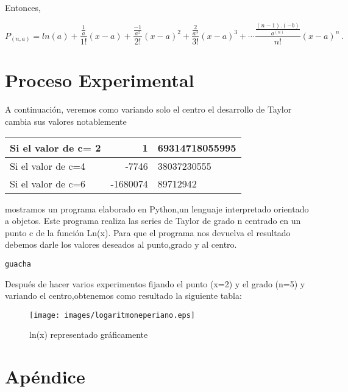 \documentclass[spanish,a4paper,11pt,twoside]{report}
\begin{document}
Entonces,

\[ P_{(n,a)} = ln(a)+\frac{\frac{1}{a}}{1!}(x-a)+\frac{\frac{-1}{a^2}}{2!}(x-a)^2+\frac{\frac{2}{a^3}}{3!}(x-a)^3+\cdots \frac{ \frac{(n-1).(-b)}{a^{(n)}}}{n!} (x-a)^{n}\,. \]

\chapter{Proceso Experimental} 
A continuación, veremos como variando solo el centro el desarrollo de Taylor cambia sus valores notablemente

\begin{tabular}{|l | r@{,}l |}
\hline
Si el valor de c= 2 &  1 & 69314718055995\\
\hline
Si el valor de c=4  & -7746 & 38037230555\\
\hline
Si el valor de c=6  & -1680074 & 89712942
\\
\hline
\end{tabular}


mostramos un programa elaborado en Python,un lenguaje interpretado orientado a objetos. Este programa realiza las series de Taylor de grado n centrado en un punto c de la función Ln(x). Para que el programa nos 
devuelva el resultado debemos darle los valores deseados al punto,grado y al centro. 

\begin{verbatim}
guacha

\end{verbatim} 

Después de hacer varios experimentos fijando el punto (x=2) y el grado (n=5) y variando el centro,obtenemos como resultado la siguiente tabla:




\begin{figure}[!th]
\begin{center}
\texttt{[image: images/logaritmoneperiano.eps]}
\caption{ln(x) representado gráficamente}
\label{fig:1}
\end{center}
\end{figure}

\chapter{Apéndice}
\end{document}
